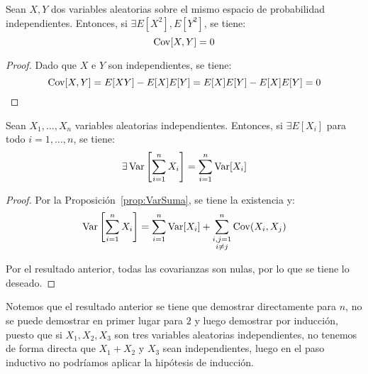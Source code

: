 \begin{coro}
    Sean $X,Y$ dos variables aleatorias sobre el mismo espacio de probabilidad independientes. Entonces, si $\exists E[X^2],E[Y^2]$, se tiene:
    \[
        \operatorname{Cov}[X,Y] = 0
    \]
\end{coro}
\begin{proof}
    Dado que $X$ e $Y$ son independientes, se tiene:
    \[
        \operatorname{Cov}[X,Y] = E[XY] - E[X]E[Y] = E[X]E[Y] - E[X]E[Y] = 0
    \]
\end{proof}

\begin{coro}
    Sean $X_1,\dots,X_n$ variables aleatorias independientes. Entonces, si $\exists E[X_i]$ para todo $i = 1, \ldots, n$, se tiene:
    \begin{equation*}
        \exists  \operatorname{Var}\left[\sum_{i=1}^n X_i\right] = \sum_{i=1}^n \operatorname{Var}[X_i]
    \end{equation*}
\end{coro}
\begin{proof}
    Por la Proposición~\ref{prop:VarSuma}, se tiene la existencia y:
    \begin{equation*}
        \operatorname{Var}\left[\sum_{i=1}^n X_i\right] = \sum_{i=1}^n \operatorname{Var}[X_i] + \sum_{\substack{i,j=1\\i\neq j}}^n \operatorname{Cov}(X_i,X_j)
    \end{equation*}

    Por el resultado anterior, todas las covarianzas son nulas, por lo que se tiene lo deseado.
\end{proof}

Notemos que el resultado anterior se tiene que demostrar directamente para $n$, no se puede demostrar en primer lugar para $2$ y luego demostrar por inducción, puesto que si $X_1, X_2,X_3$ son tres variables aleatorias independientes, no tenemos de forma directa que $X_1+X_2$ y $X_3$ sean independientes, luego en el paso inductivo no podríamos aplicar la hipótesis de inducción.


